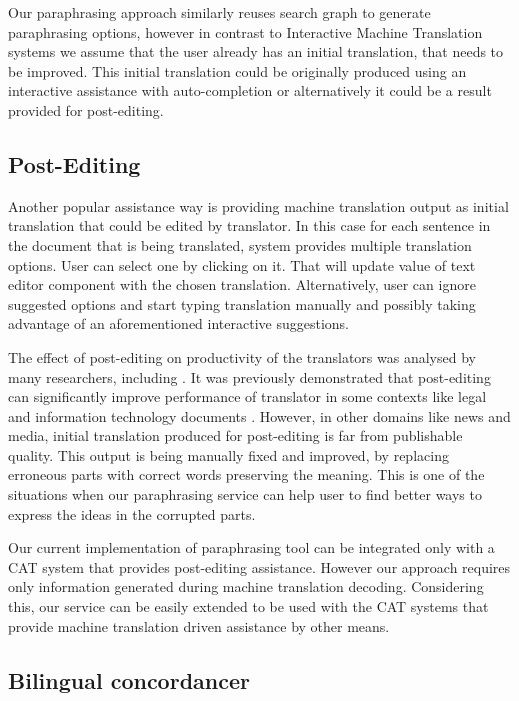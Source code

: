 Our paraphrasing approach similarly reuses search graph to generate paraphrasing options, however in contrast to Interactive Machine Translation systems we assume that the user already has an initial translation, that needs to be improved. This initial translation could be originally produced using an interactive assistance with auto-completion or alternatively it could be a result provided for post-editing.

\subsection{Post-Editing}

Another popular assistance way is providing machine translation output as initial translation that could be edited by  translator. In this case for each sentence in the document that is being translated, system provides multiple translation options. User can select one by clicking on it. That will update value of text editor component with the chosen translation. Alternatively, user can ignore suggested options and start typing translation manually and possibly taking advantage of an aforementioned interactive suggestions.  

The effect of post-editing on productivity of the translators was analysed by many researchers, including \cite{guerberof2009productivity}. It was previously demonstrated that post-editing can significantly improve performance of translator in some contexts like legal and information technology documents \cite{federico2012measuring}. However, in other domains like news and media, initial translation produced for post-editing is far from publishable quality. This output is being manually fixed and improved, by replacing erroneous parts with correct words preserving the meaning. This is one of the situations when our paraphrasing service can help user to find better ways to express the ideas in the corrupted parts.

Our current implementation of paraphrasing tool can be integrated only with a CAT system that provides post-editing assistance. However our approach requires only information generated during machine translation decoding. Considering this, our service can be easily extended to be used with the CAT systems that provide machine translation driven assistance by other means.

\subsection{Bilingual concordancer}

